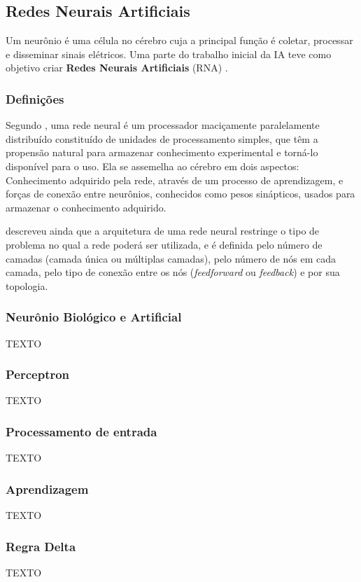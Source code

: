 \subsection{Redes Neurais Artificiais}
\label{sec:RNA}
Um neurônio é uma célula no cérebro cuja a principal função é coletar, processar e disseminar sinais elétricos. Uma parte do trabalho inicial da IA teve como objetivo criar \textbf{Redes Neurais Artificiais} (RNA) \cite{russell2004inteligencia}.

\subsubsection{\textbf{Definições}}
Segundo , uma rede neural é um processador maciçamente paralelamente distribuído constituído de unidades de processamento simples, que têm a propensão natural para armazenar conhecimento experimental e torná-lo disponível para o uso. Ela se assemelha ao cérebro em dois aspectos: Conhecimento adquirido pela rede, através de um processo de aprendizagem, e forças de conexão entre neurônios, conhecidos como pesos sinápticos, usados para armazenar o conhecimento adquirido.

 descreveu ainda que a arquitetura de uma rede neural restringe o tipo de problema no qual a rede poderá ser utilizada, e é definida pelo número de camadas (camada única ou múltiplas camadas), pelo número de nós em cada camada, pelo tipo de conexão entre os nós (\textit{feedforward} ou \textit{feedback}) e por sua topologia.

\subsubsection{Neurônio Biológico e Artificial}
{\color{red}TEXTO}
\subsubsection{Perceptron}
{\color{red}TEXTO}
\subsubsection{Processamento de entrada}
{\color{red}TEXTO}
\subsubsection{Aprendizagem}
{\color{red}TEXTO}
\subsubsection{Regra Delta}
{\color{red}TEXTO}
